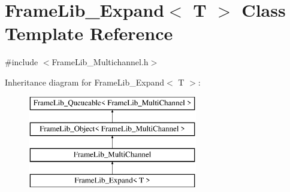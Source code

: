 \hypertarget{class_frame_lib___expand}{}\section{Frame\+Lib\+\_\+\+Expand$<$ T $>$ Class Template Reference}
\label{class_frame_lib___expand}


{\ttfamily \#include $<$Frame\+Lib\+\_\+\+Multichannel.\+h$>$}

Inheritance diagram for Frame\+Lib\+\_\+\+Expand$<$ T $>$\+:\begin{figure}[H]
\begin{center}
\leavevmode
\includegraphics[height=4.000000cm]{class_frame_lib___expand}
\end{center}
\end{figure}
